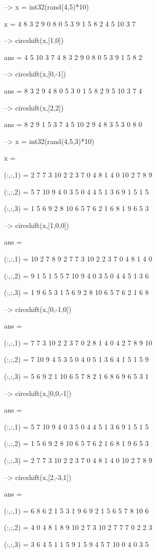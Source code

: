 \begin{DoxyVerbInclude}
--> x = int32(rand(4,5)*10)

x = 
  4  8  3  2  9 
  0  8  0  5  3 
  9  1  5  8  2 
  4  5 10  3  7 

--> circshift(x,[1,0])

ans = 
  4  5 10  3  7 
  4  8  3  2  9 
  0  8  0  5  3 
  9  1  5  8  2 

--> circshift(x,[0,-1])

ans = 
  8  3  2  9  4 
  8  0  5  3  0 
  1  5  8  2  9 
  5 10  3  7  4 

--> circshift(x,[2,2])

ans = 
  8  2  9  1  5 
  3  7  4  5 10 
  2  9  4  8  3 
  5  3  0  8  0 

--> x = int32(rand(4,5,3)*10)

x = 

(:,:,1) = 
  2  7  7  3 10 
  2  2  3  7  0 
  4  8  1  4  0 
 10  2  7  8  9 

(:,:,2) = 
  5  7 10  9  4 
  0  3  5  0  4 
  4  5  1  3  6 
  9  1  5  1  5 

(:,:,3) = 
  1  5  6  9  2 
  8 10  6  5  7 
  6  2  1  6  8 
  1  9  6  5  3 

--> circshift(x,[1,0,0])

ans = 

(:,:,1) = 
 10  2  7  8  9 
  2  7  7  3 10 
  2  2  3  7  0 
  4  8  1  4  0 

(:,:,2) = 
  9  1  5  1  5 
  5  7 10  9  4 
  0  3  5  0  4 
  4  5  1  3  6 

(:,:,3) = 
  1  9  6  5  3 
  1  5  6  9  2 
  8 10  6  5  7 
  6  2  1  6  8 

--> circshift(x,[0,-1,0])

ans = 

(:,:,1) = 
  7  7  3 10  2 
  2  3  7  0  2 
  8  1  4  0  4 
  2  7  8  9 10 

(:,:,2) = 
  7 10  9  4  5 
  3  5  0  4  0 
  5  1  3  6  4 
  1  5  1  5  9 

(:,:,3) = 
  5  6  9  2  1 
 10  6  5  7  8 
  2  1  6  8  6 
  9  6  5  3  1 

--> circshift(x,[0,0,-1])

ans = 

(:,:,1) = 
  5  7 10  9  4 
  0  3  5  0  4 
  4  5  1  3  6 
  9  1  5  1  5 

(:,:,2) = 
  1  5  6  9  2 
  8 10  6  5  7 
  6  2  1  6  8 
  1  9  6  5  3 

(:,:,3) = 
  2  7  7  3 10 
  2  2  3  7  0 
  4  8  1  4  0 
 10  2  7  8  9 

--> circshift(x,[2,-3,1])

ans = 

(:,:,1) = 
  6  8  6  2  1 
  5  3  1  9  6 
  9  2  1  5  6 
  5  7  8 10  6 

(:,:,2) = 
  4  0  4  8  1 
  8  9 10  2  7 
  3 10  2  7  7 
  7  0  2  2  3 

(:,:,3) = 
  3  6  4  5  1 
  1  5  9  1  5 
  9  4  5  7 10 
  0  4  0  3  5 
\end{DoxyVerbInclude}

